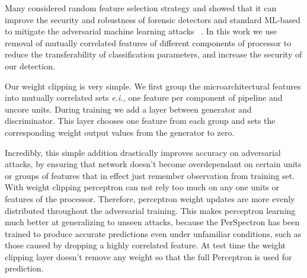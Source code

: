 Many considered random feature selection
strategy and showed that it can improve the security and robustness of forensic detectors and
standard ML-based to mitigate the adversarial machine learning attacks ~\cite{nowroozi2020survey, secureDetection2019}.
 In this work we use removal of mutually correlated features of different components of processor to reduce the transferability of classification parameters, and increase the security of our 
detection. 

Our weight clipping is very simple. We first group the microarchitectural features into mutually correlated sets {\em e.i.,} one feature per component of pipeline and uncore units. During training we add a layer between generator and discriminator. This layer chooses one feature from each group and sets the corresponding weight output values from the generator to zero.

Incredibly, this simple addition drastically improves accuracy on adversarial attacks, by ensuring that network doesn't become overdependant on certain units or groups of features that in effect just remember observation from training set. With weight clipping perceptron can not rely too much on any one units or features of the processor. Therefore, perceptron weight updates are more evenly distributed throughout the adversarial training. This makes perceptron learning much better at generalizing to unseen attacks, because the PerSpectron has been trained to produce accurate predictions even under unfamiliar conditions, such as those caused by dropping a highly correlated feature. At test time the weight clipping layer doesn't remove any weight so that the full Perceptron is used for prediction. 
